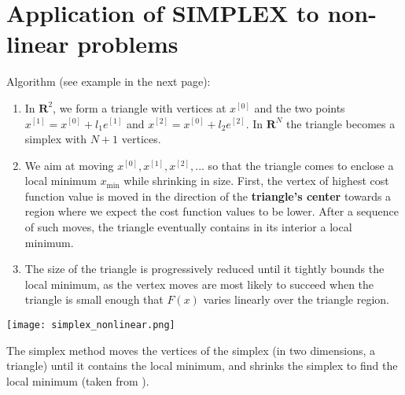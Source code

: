 \documentclass[c]{beamer}
\begin{document}
\section{Application of SIMPLEX to non-linear problems}


\begin{frame}
  Algorithm (see example in the next page):
\begin{enumerate}
\item In $\mathbf{R}^2$, we form a triangle with vertices at $x^{[0]}$ and the two points $x^{[1]} = x^{[0]} + l_1e^{[1]}$ and  $x^{[2]} = x^{[0]} + l_2e^{[2]}$. In $\mathbf{R}^N$ the triangle becomes a simplex with $N + 1$ vertices.
\item We aim at moving ${x^{[0]}, x^{[1]}, x^{[2]},...}$ so that the triangle comes to enclose a local minimum $x_{\mathrm{min}}$ while shrinking in size.  First, the vertex of highest cost function value is moved in the direction of the {\bf triangle’s center} towards a region where we expect the cost function values to be lower. After a sequence of such moves, the triangle eventually contains in its interior a local minimum. 
\item The size of the triangle is progressively reduced until it tightly bounds the local minimum, as the vertex moves are most likely to succeed when the triangle is small enough that $F(x)$ varies linearly over the triangle region.
\end{enumerate}
\end{frame}

\begin{frame}
  \begin{center}
    \texttt{[image: simplex\_nonlinear.png]}
  \end{center}
  The simplex method moves the vertices of the simplex (in two dimensions, a triangle) until it contains the local minimum, and shrinks the simplex to find the local minimum (taken from \cite{beers}).
\end{frame}


\end{document}
